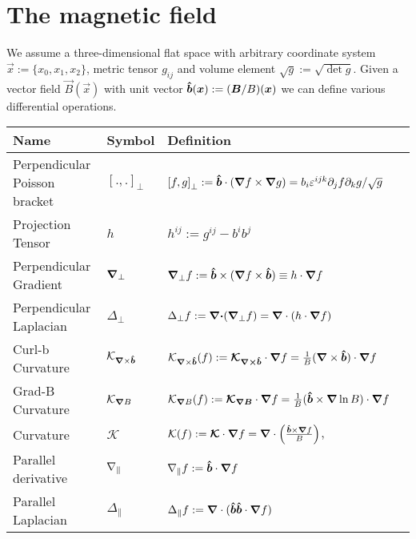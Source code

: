 \section{The magnetic field}\label{sec:magnetic}
We assume a three-dimensional flat space with arbitrary coordinate
system $\vec x :=\{x_0, x_1, x_2\}$, metric
tensor $g_{ij}$ and volume element $\sqrt{g} := \sqrt{\det g}$.
Given a vector field $\vec B(\vec x)$ with unit vector $\bm{\hat{b}}({\boldsymbol{x}}) := ({\boldsymbol{B}}/B)({{\boldsymbol{x}}})$
we can define various differential operations.
\begin{longtable}{lll>{\RaggedRight}p{7cm}}
\rowcolor{gray!50}\textbf{Name} &  \textbf{Symbol} & \textbf{Definition} \\
\midrule
    Perpendicular Poisson bracket&
    $\left[.,.\right]_\perp$ &
    $\left[f,g\right]_\perp := \bm{\hat{b}} \cdot \left({\boldsymbol{\nabla}} f \times {\boldsymbol{\nabla}} g\right) =
    b_i \varepsilon^{ijk}\partial_j f\partial_k g/\sqrt{g}$  \\
    Projection Tensor&
    $h $ & $h^{ij} := g^{ij} - b^ib^j $\\
    Perpendicular Gradient&
    ${\boldsymbol{\nabla}}_{\perp} $&
    $ {\boldsymbol{\nabla}}_{\perp} f := \bm{\hat{b}}\times({\boldsymbol{\nabla}} f\times \bm{\hat{b}} ) \equiv
    h \cdot{\boldsymbol{\nabla}} f$ \\
    Perpendicular Laplacian&
    $\Delta_\perp $&
    $ \Delta_\perp f:= {\boldsymbol{{\boldsymbol{\nabla}}\cdot}} ({\boldsymbol{\nabla}}_{\perp} f)
    = {\boldsymbol{\nabla}}\cdot( h\cdot{\boldsymbol{\nabla}} f)$  \\
    Curl-b Curvature &
    $\mathcal K_{{\boldsymbol{\nabla}}\times\bm{\hat{b}}}$ &
    $\mathcal K_{{\boldsymbol{\nabla}}\times\bm{\hat{b}}}(f) := {\boldsymbol{ \mathcal K_{{\boldsymbol{\nabla}}\times\bm{\hat{b}}} }}\cdot{\boldsymbol{\nabla}} f = \frac{1}{B}({\boldsymbol{\nabla}} \times \bm{\hat{b}})\cdot{\boldsymbol{\nabla}} f$ \\[4pt]
    Grad-B Curvature &
    $\mathcal K_{{\boldsymbol{\nabla}} B} $ &
    $\mathcal K_{{\boldsymbol{\nabla}} B}(f) := {\boldsymbol{\mathcal K_{{\boldsymbol{\nabla}} B}}} \cdot{\boldsymbol{\nabla}} f = \frac{1}{B}(\bm{\hat{b}} \times {\boldsymbol{\nabla}} \ln B)\cdot{\boldsymbol{\nabla}} f$ \\[4pt]
    Curvature &
    $\mathcal K$ &
    $\mathcal{K}(f):={\boldsymbol{\mathcal K}} \cdot{\boldsymbol{\nabla}} f =
     {\boldsymbol{\nabla}}\cdot\left(\frac{\bm{\hat{b}}\times{\boldsymbol{\nabla}} f}{B}\right)$,\\[4pt]
    Parallel derivative&
    $\nabla_\parallel $&
    $ \nabla_\parallel f := \bm{\hat{b}}\cdot{\boldsymbol{\nabla}} f$ \\
    Parallel Laplacian&
    $\Delta_\parallel $&
    $\Delta_\parallel f:= {\boldsymbol{\nabla}}\cdot ( \bm{\hat{b}}\bm{\hat{b}}\cdot{\boldsymbol{\nabla}} f )$\\
\bottomrule
\end{longtable}
